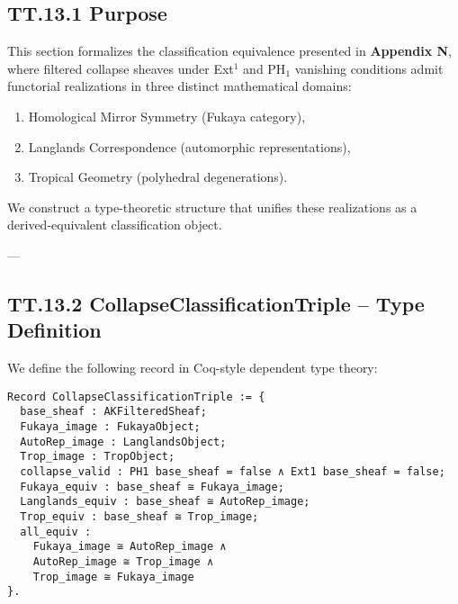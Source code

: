 \documentclass[11pt]{article}
\begin{document}
\subsection*{TT.13.1 Purpose}

This section formalizes the classification equivalence presented in \textbf{Appendix N},  
where filtered collapse sheaves under Ext$^1$ and PH$_1$ vanishing conditions admit  
functorial realizations in three distinct mathematical domains:

\begin{enumerate}
  \item Homological Mirror Symmetry (Fukaya category),
  \item Langlands Correspondence (automorphic representations),
  \item Tropical Geometry (polyhedral degenerations).
\end{enumerate}

We construct a type-theoretic structure that unifies these realizations  
as a derived-equivalent classification object.

---

\subsection*{TT.13.2 CollapseClassificationTriple – Type Definition}

We define the following record in Coq-style dependent type theory:

\begin{verbatim}
Record CollapseClassificationTriple := {
  base_sheaf : AKFilteredSheaf;
  Fukaya_image : FukayaObject;
  AutoRep_image : LanglandsObject;
  Trop_image : TropObject;
  collapse_valid : PH1 base_sheaf = false ∧ Ext1 base_sheaf = false;
  Fukaya_equiv : base_sheaf ≅ Fukaya_image;
  Langlands_equiv : base_sheaf ≅ AutoRep_image;
  Trop_equiv : base_sheaf ≅ Trop_image;
  all_equiv :
    Fukaya_image ≅ AutoRep_image ∧
    AutoRep_image ≅ Trop_image ∧
    Trop_image ≅ Fukaya_image
}.
\end{verbatim}
\end{document}
